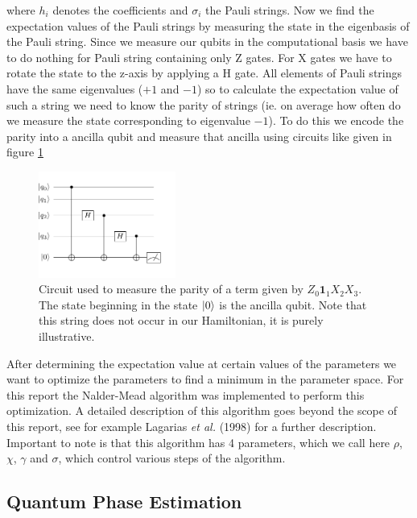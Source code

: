 \documentclass[10 pt, a4paper]{article}
\begin{document}
where $h_i$ denotes the coefficients and $\sigma_i$ the Pauli strings. Now we find the expectation values of the Pauli strings by measuring the state in the eigenbasis of the Pauli string. Since we measure our qubits in the computational basis we have to do nothing for Pauli string containing only Z gates. For X gates we have to rotate the state to the z-axis by applying a H gate. All elements of Pauli strings have the same eigenvalues ($+1$ and $-1$) so to calculate the expectation value of such a string we need to know the parity of strings (ie. on average how often do we measure the state corresponding to eigenvalue $-1$). To do this we encode the parity into a ancilla qubit and measure that ancilla using  circuits like given in figure \ref{fig:m}

\begin{figure}[H]
\centering
\includegraphics[width=0.4\textwidth]{Measurement}
\caption{Circuit used to measure the parity of a term given by $Z_0 \mathbf{1}_1 X_2 X_3$. The state beginning in the state $\ket{0}$ is the ancilla qubit. Note that this string does not occur in our Hamiltonian, it is purely illustrative.} \label{fig:m}
\end{figure}

After determining the expectation value at certain values of the parameters we want to optimize the parameters to find a minimum in the parameter space. For this report the Nalder-Mead algorithm was implemented to perform this optimization. A detailed description of this algorithm goes beyond the scope of this report, see for example Lagarias \textit{et al.} (1998) \cite{neldermead} for a further description. Important to note is that this algorithm has 4 parameters, which we call here $\rho$, $\chi$, $\gamma$ and $\sigma$, which control various steps of the algorithm. 


\subsection{Quantum Phase Estimation} \label{sec:qpe}
\end{document}
